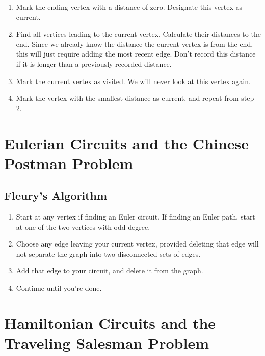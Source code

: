 \begin{algorithm}
  \begin{enumerate}
  \item Mark the ending vertex with a distance of zero. Designate this
    vertex as current.

  \item Find all vertices leading to the current vertex. Calculate
    their distances to the end. Since we already know the distance the
    current vertex is from the end, this will just require adding the
    most recent edge. Don't record this distance if it is longer than
    a previously recorded distance.

  \item Mark the current vertex as visited. We will never look at this
    vertex again.

  \item Mark the vertex with the smallest distance as current, and
    repeat from step 2.
  \end{enumerate}
\end{algorithm}

\section{Eulerian Circuits and the Chinese Postman Problem}%
\label{sec:eulerian-circuits}

\subsection{Fleury's Algorithm}%
\label{sub:Fleury's Algorithm}

\begin{algorithm}
  \begin{enumerate}
  \item Start at any vertex if finding an Euler circuit. If finding an
    Euler path, start at one of the two vertices with odd degree.
  \item Choose any edge leaving your current vertex, provided deleting
    that edge will not separate the graph into two disconnected sets
    of edges.
  \item Add that edge to your circuit, and delete it from the graph.
  \item Continue until you're done.
  \end{enumerate}
\end{algorithm}

\section{Hamiltonian Circuits and the Traveling Salesman Problem}%
\label{sec:hamiltonian-circuits}

